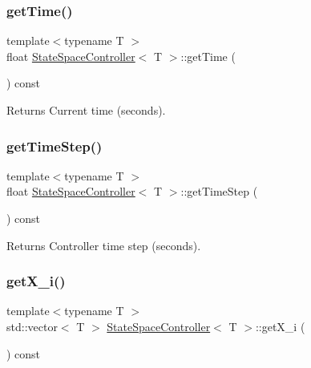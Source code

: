 \subsubsection{\texorpdfstring{get\+Time()}{getTime()}}
{\footnotesize\ttfamily template$<$typename T $>$ \\
float \hyperlink{classStateSpaceController}{State\+Space\+Controller}$<$ T $>$\+::get\+Time (\begin{DoxyParamCaption}{ }\end{DoxyParamCaption}) const}

\begin{DoxyReturn}{Returns}
Current time (seconds). 
\end{DoxyReturn}
\mbox{\label{classStateSpaceController_acc70705c898b1338346b63e83ea4fe2a}} 
\subsubsection{\texorpdfstring{get\+Time\+Step()}{getTimeStep()}}
{\footnotesize\ttfamily template$<$typename T $>$ \\
float \hyperlink{classStateSpaceController}{State\+Space\+Controller}$<$ T $>$\+::get\+Time\+Step (\begin{DoxyParamCaption}{ }\end{DoxyParamCaption}) const}

\begin{DoxyReturn}{Returns}
Controller time step (seconds). 
\end{DoxyReturn}
\mbox{\label{classStateSpaceController_a0d7bd27e0139221d7b2de5e7e8830d98}} 
\subsubsection{\texorpdfstring{get\+X\+\_\+i()}{getX\_i()}}
{\footnotesize\ttfamily template$<$typename T $>$ \\
std\+::vector$<$ T $>$ \hyperlink{classStateSpaceController}{State\+Space\+Controller}$<$ T $>$\+::get\+X\+\_\+i (\begin{DoxyParamCaption}{ }\end{DoxyParamCaption}) const}

